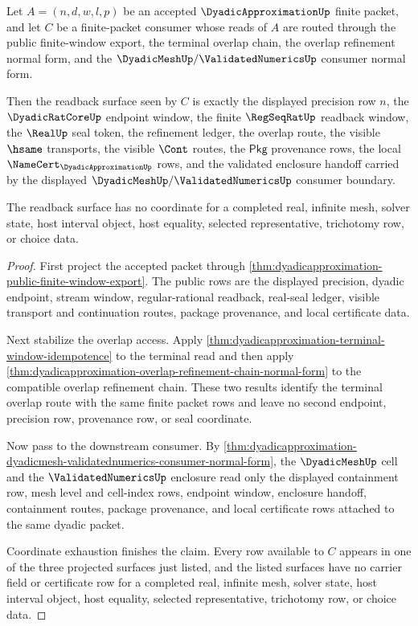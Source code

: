 \begin{theorem}
\label{thm:dyadicapproximation-finite-packet-readback-exhaustion}
Let $A=(n,d,w,l,p)$ be an accepted $\DyadicApproximationUp$ finite packet, and let
$C$ be a finite-packet consumer whose reads of $A$ are routed through the public
finite-window export, the terminal overlap chain, the overlap refinement normal
form, and the $\DyadicMeshUp/\ValidatedNumericsUp$ consumer normal form.

Then the readback surface seen by $C$ is exactly the displayed precision row
$n$, the $\DyadicRatCoreUp$ endpoint window, the finite $\RegSeqRatUp$ readback
window, the $\RealUp$ seal token, the refinement ledger, the overlap route, the
visible $\hsame$ transports, the visible $\Cont$ routes, the $\mathsf{Pkg}$
provenance rows, the local $\NameCert_{\DyadicApproximationUp}$ rows, and the
validated enclosure handoff carried by the displayed
$\DyadicMeshUp/\ValidatedNumericsUp$ consumer boundary.

The readback surface has no coordinate for a completed real, infinite mesh,
solver state, host interval object, host equality, selected representative,
trichotomy row, or choice data.
\end{theorem}
\begin{proof}
First project the accepted packet through
\autoref{thm:dyadicapproximation-public-finite-window-export}. The public rows
are the displayed precision, dyadic endpoint, stream window, regular-rational
readback, real-seal ledger, visible transport and continuation routes, package
provenance, and local certificate data.

Next stabilize the overlap access. Apply
\autoref{thm:dyadicapproximation-terminal-window-idempotence} to the terminal
read and then apply
\autoref{thm:dyadicapproximation-overlap-refinement-chain-normal-form} to the
compatible overlap refinement chain. These two results identify the terminal
overlap route with the same finite packet rows and leave no second endpoint,
precision row, provenance row, or seal coordinate.

Now pass to the downstream consumer. By
\autoref{thm:dyadicapproximation-dyadicmesh-validatednumerics-consumer-normal-form},
the $\DyadicMeshUp$ cell and the $\ValidatedNumericsUp$ enclosure read only the
displayed containment row, mesh level and cell-index rows, endpoint window,
enclosure handoff, containment routes, package provenance, and local certificate
rows attached to the same dyadic packet.

Coordinate exhaustion finishes the claim. Every row available to $C$ appears in
one of the three projected surfaces just listed, and the listed surfaces have no
carrier field or certificate row for a completed real, infinite mesh, solver
state, host interval object, host equality, selected representative, trichotomy
row, or choice data.
\end{proof}
